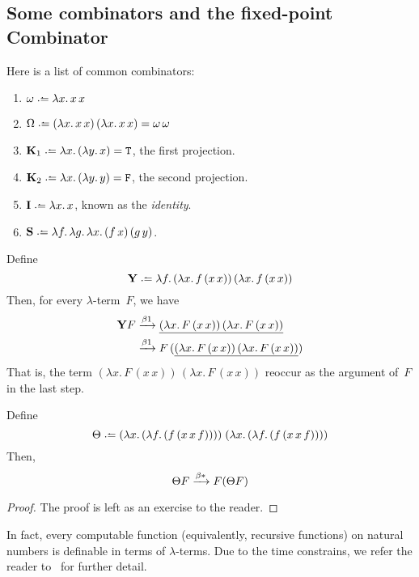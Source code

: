 \subsection{Some combinators and the fixed-point Combinator}
Here is a list of common combinators:
\begin{enumerate}
  \item $\omega \defeq \lambda x.\, x\,x$
  \item $\Omega \defeq (\lambda x.\, x\,x)\,(\lambda x.\,x\,x)
    = \omega\,\omega$
  \item $\mathbf{K}_1 \defeq \lambda x.\,(\lambda y.\,
    x) = \mathtt{T}$, the first projection.
  \item $\mathbf{K}_2 \defeq \lambda x.\,(\lambda y.\,
    y) = \mathtt{F}$, the second projection.
  \item $\mathbf{I} \defeq \lambda x.\, x$, known as the \emph{identity}.
  \item $\mathbf{S}\defeq\lambda f.\,\lambda g.\,\lambda x.\, 
    (f\,x)\,(g\,y)$.
\end{enumerate}
\begin{proposition}
  Define
  \[
    \mathbf{Y} \defeq
    \lambda f.\, (\lambda x.\, f\,(x\,x))\,(\lambda x.\,f\,(x\,x))
  \]
  Then, for every $\lambda$-term~$F$, we have
  \begin{align*}
    \mathbf{Y}F
    & \xrightarrow{\beta1} \underline{(\lambda x.\,F\,(x\,x))\,(\lambda x.\, F\,(x\,x))} \\
    & \xrightarrow{\beta1} F\,(\underline{(\lambda x.\,F\,(x\,x))\,(\lambda x.\,
      F\,(x\,x))})
  \end{align*}
  That is, the term $(\lambda x.\,F\,(x\,x))\,(\lambda x.\, F\,(x\,x))$
  reoccur as the argument of~$F$ in the last step.
\end{proposition}

\begin{proposition}
  Define 
  \[
    \Theta \defeq 
    (\lambda x.\,(\lambda f.\,(f\,(x\,x\,f))))\;
    (\lambda x.\,(\lambda f.\,(f\,(x\,x\,f))))
  \]
  Then, 
  \[
    \Theta F \xrightarrow{\beta*} F (\Theta F)
  \]
\end{proposition}
\begin{proof}
  The proof is left as an exercise to the reader.
\end{proof}

In fact, every computable function (equivalently, recursive functions) on
natural numbers is definable in terms of $\lambda$-terms. Due to the time
constrains, we refer the reader to~\cite[Chapter 3]{Barendregt1984} for further
detail.

